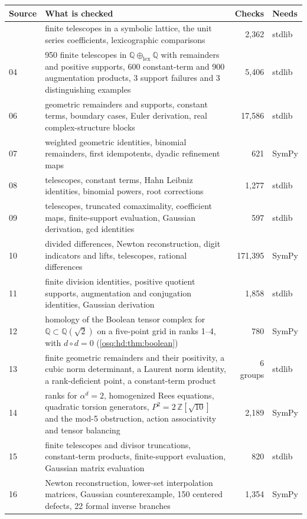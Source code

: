 \documentclass[11pt,letterpaper]{article}
\numberwithin{equation}{section}
\theoremstyle{definition}
\theoremstyle{remark}
\theoremstyle{plain}
\newcommand{\Z}{\mathbb Z}
\newcommand{\Q}{\mathbb Q}
\begin{document}
\begingroup\small
\begin{longtable}{@{}l>{\raggedright\arraybackslash}p{}rl@{}}
\toprule
Source & What is checked & Checks & Needs\\
\midrule
\endhead
\bottomrule
\endlastfoot
03 & finite telescopes in a symbolic lattice, the unit series coefficients, lexicographic comparisons & 2{,}362 & stdlib\\
04 & 1{,}950 finite telescopes in $\Q\oplus_{\mathrm{lex}}\Q$ with remainders and positive supports, 600 constant-term and 900 augmentation products, 3 support failures and 3 distinguishing examples & 5{,}406 & stdlib\\
06 & geometric remainders and supports, constant terms, boundary cases, Euler derivation, real complex-structure blocks & 17{,}586 & stdlib\\
07 & weighted geometric identities, binomial remainders, first idempotents, dyadic refinement maps & 621 & SymPy\\
08 & telescopes, constant terms, Hahn Leibniz identities, binomial powers, root corrections & 1{,}277 & stdlib\\
09 & telescopes, truncated comaximality, coefficient maps, finite-support evaluation, Gaussian derivation, gcd identities & 597 & stdlib\\
10 & divided differences, Newton reconstruction, digit indicators and lifts, telescopes, rational differences & 171{,}395 & SymPy\\
11 & finite division identities, positive quotient supports, augmentation and conjugation identities, Gaussian derivation & 1{,}858 & stdlib\\
12 & homology of the Boolean tensor complex for $\Q\subset\Q(\sqrt2)$ on a five-point grid in ranks 1--4, with $d\circ d=0$ (\cref{osq:hd:thm:boolean}) & 780 & SymPy\\
13 & 51 finite geometric remainders and their positivity, a cubic norm determinant, a Laurent norm identity, a rank-deficient point, a constant-term product & 6 groups & stdlib\\
14 & ranks for $\alpha^d=2$, homogenized Rees equations, quadratic torsion generators, $P^2=2\,\Z[\sqrt{10}]$ and the mod-5 obstruction, action associativity and tensor balancing & 2{,}189 & SymPy\\
15 & finite telescopes and divisor truncations, constant-term products, finite-support evaluation, Gaussian matrix evaluation & 820 & stdlib\\
16 & Newton reconstruction, lower-set interpolation matrices, Gaussian counterexample, 150 centered defects, 22 formal inverse branches & 1{,}354 & SymPy\\

\end{longtable}
\end{document}
